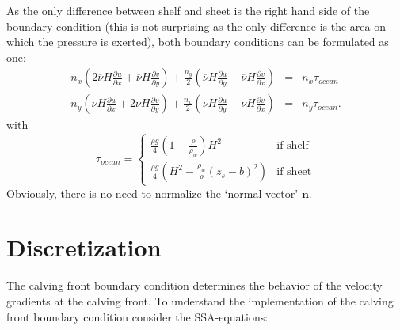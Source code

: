 \documentclass[a4paper,10pt]{article}
\begin{document}
As the only difference between shelf and sheet is the right hand side of the boundary condition (this is not surprising as the only difference is the area on which the pressure is exerted), both boundary conditions can be formulated as one:
\begin{eqnarray}%
n_x\left(2\overline{\nu}H\frac{\partial u}{\partial x}+\overline{\nu}H\frac{\partial v}{\partial y}  \right) + \frac{n_y}{2} \left(\overline{\nu}H\frac{\partial u}{\partial y} + \overline{\nu}H\frac{\partial v}{\partial x} \right) & =  & n_x\tau_{ocean} \label{BC1}\\
 n_y\left(\overline{\nu}H\frac{\partial u}{\partial x}+2\overline{\nu}H\frac{\partial v}{\partial y}  \right) + \frac{n_x}{2} \left(\overline{\nu}H\frac{\partial u}{\partial y} + \overline{\nu}H\frac{\partial v}{\partial x} \right) & = & n_y\tau_{ocean}. \label{BC2}
\end{eqnarray}
with
\begin{equation}
\tau_{ocean} = \left\{
\begin{array}{ll}
\frac{\rho g}{4}\left(1-\frac{\rho}{\rho_w}\right)H^2 & \text{if shelf} \\
\frac{\rho g}{4}\left(H^2-\frac{\rho_w}{\rho} ( z_s-b)^2 \right) & \text{if sheet}
\end{array} \right.
\end{equation}
Obviously, there is no need to normalize the `normal vector' $\mathbf{n}$.
\section{Discretization}

\noindent The calving front boundary condition determines the behavior of the velocity gradients at the calving front. To understand the implementation of the calving front boundary condition consider the SSA-equations:
\end{document}
